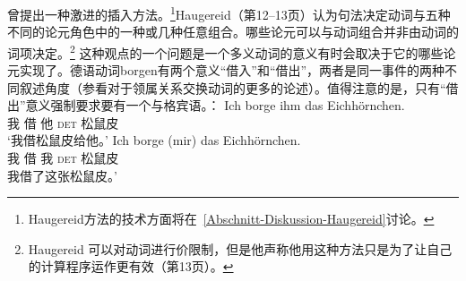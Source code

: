 \begin{exe}
\begin{xlist}[iv.]
\begin{exe}
\begin{xlist}[iv.]
\citet{Haugereid2009a}曾提出一种激进的插入方法。\footnote{%
  Haugereid方法的技术方面将在~\ref{Abschnitt-Diskussion-Haugereid}讨论。
}Haugereid（第12--13页）认为句法决定动词与五种不同的论元角色中的一种或几种任意组合。哪些论元可以与动词组合并非由动词的词项决定。\footnote{%
  Haugereid 可以对动词进行价限制，但是他声称他用这种方法只是为了让自己的计算程序运作更有效（第13页）。
}
这种观点的一个问题是一个多义动词的意义有时会取决于它的哪些论元实现了。德语动词borgen有两个意义“借入”和“借出”，两者是同一事件的两种不同叙述角度（参看对于领属关系交换动词的更多的论述）。值得注意的是，只有“借出”意义强制要求要有一个与格宾语。\citep[]{MuellerGTBuch1}：
\eal
\ex 
\gll Ich borge ihm das Eichhörnchen.\\
     我   借  他 \textsc{det} 松鼠皮\\
\glt `我借松鼠皮给他。'
\ex 
\gll Ich borge (mir) das Eichhörnchen.\\
     我 借 我 \textsc{det} 松鼠皮\\
\glt 我借了这张松鼠皮。'

\end{xlist}
\end{exe}
\end{xlist}
\end{exe}
